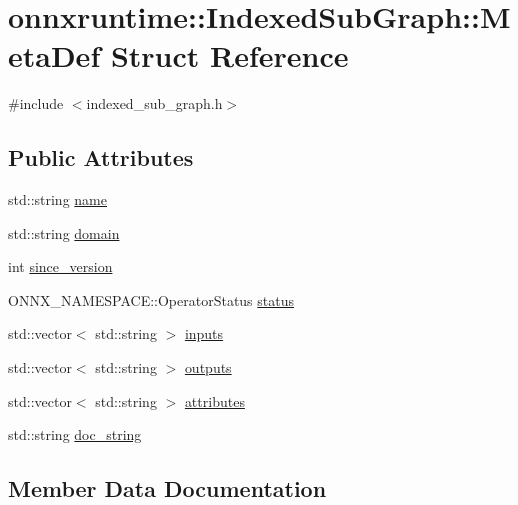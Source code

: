 \hypertarget{structonnxruntime_1_1IndexedSubGraph_1_1MetaDef}{}\section{onnxruntime\+:\+:Indexed\+Sub\+Graph\+:\+:Meta\+Def Struct Reference}
\label{structonnxruntime_1_1IndexedSubGraph_1_1MetaDef}


{\ttfamily \#include $<$indexed\+\_\+sub\+\_\+graph.\+h$>$}

\subsection*{Public Attributes}
\begin{DoxyCompactItemize}
\item 
std\+::string \mbox{\hyperlink{structonnxruntime_1_1IndexedSubGraph_1_1MetaDef_aaa0ea00fd962baff7055e0bc925720e1}{name}}
\item 
std\+::string \mbox{\hyperlink{structonnxruntime_1_1IndexedSubGraph_1_1MetaDef_a93c5fe6a6a15c4c36501fa88f5b8fbae}{domain}}
\item 
int \mbox{\hyperlink{structonnxruntime_1_1IndexedSubGraph_1_1MetaDef_a84b4761d426f12c383515db23147bffd}{since\+\_\+version}}
\item 
O\+N\+N\+X\+\_\+\+N\+A\+M\+E\+S\+P\+A\+C\+E\+::\+Operator\+Status \mbox{\hyperlink{structonnxruntime_1_1IndexedSubGraph_1_1MetaDef_a026af043d1fa30e73e200a9823418633}{status}}
\item 
std\+::vector$<$ std\+::string $>$ \mbox{\hyperlink{structonnxruntime_1_1IndexedSubGraph_1_1MetaDef_a810e668abe88822f89127af7740b9650}{inputs}}
\item 
std\+::vector$<$ std\+::string $>$ \mbox{\hyperlink{structonnxruntime_1_1IndexedSubGraph_1_1MetaDef_ad3bdd942c43979e2f38391f114b0379e}{outputs}}
\item 
std\+::vector$<$ std\+::string $>$ \mbox{\hyperlink{structonnxruntime_1_1IndexedSubGraph_1_1MetaDef_a8e8c2d1c08dd2eb0db727a83d76d005f}{attributes}}
\item 
std\+::string \mbox{\hyperlink{structonnxruntime_1_1IndexedSubGraph_1_1MetaDef_afb2298bfac3544dca07c3bf72f476817}{doc\+\_\+string}}
\end{DoxyCompactItemize}


\subsection{Member Data Documentation}
\mbox{\label{structonnxruntime_1_1IndexedSubGraph_1_1MetaDef_a8e8c2d1c08dd2eb0db727a83d76d005f}} 
